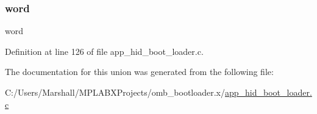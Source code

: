 \subsubsection{\texorpdfstring{word}{word}}
{\footnotesize\ttfamily word}



Definition at line 126 of file app\+\_\+hid\+\_\+boot\+\_\+loader.\+c.



The documentation for this union was generated from the following file\+:\begin{DoxyCompactItemize}
\item 
C\+:/\+Users/\+Marshall/\+M\+P\+L\+A\+B\+X\+Projects/omb\+\_\+bootloader.\+x/\mbox{\hyperlink{app__hid__boot__loader_8c}{app\+\_\+hid\+\_\+boot\+\_\+loader.\+c}}\end{DoxyCompactItemize}

